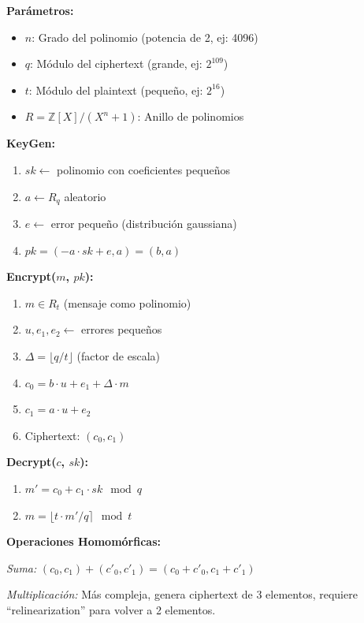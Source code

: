 \documentclass[11pt,a4paper,twoside]{book}
\theoremstyle{definition}
\theoremstyle{remark}
\begin{document}
\begin{mathnote}
\textbf{Parámetros:}
\begin{itemize}
    \item $n$: Grado del polinomio (potencia de 2, ej: 4096)
    \item $q$: Módulo del ciphertext (grande, ej: $2^{109}$)
    \item $t$: Módulo del plaintext (pequeño, ej: $2^{16}$)
    \item $R = \mathbb{Z}[X]/(X^n + 1)$: Anillo de polinomios
\end{itemize}

\textbf{KeyGen:}
\begin{enumerate}
    \item $sk \leftarrow$ polinomio con coeficientes pequeños
    \item $a \leftarrow R_q$ aleatorio
    \item $e \leftarrow$ error pequeño (distribución gaussiana)
    \item $pk = (-a \cdot sk + e, a) = (b, a)$
\end{enumerate}

\textbf{Encrypt($m$, $pk$):}
\begin{enumerate}
    \item $m \in R_t$ (mensaje como polinomio)
    \item $u, e_1, e_2 \leftarrow$ errores pequeños
    \item $\Delta = \lfloor q/t \rfloor$ (factor de escala)
    \item $c_0 = b \cdot u + e_1 + \Delta \cdot m$
    \item $c_1 = a \cdot u + e_2$
    \item Ciphertext: $(c_0, c_1)$
\end{enumerate}

\textbf{Decrypt($c$, $sk$):}
\begin{enumerate}
    \item $m' = c_0 + c_1 \cdot sk \mod q$
    \item $m = \lfloor t \cdot m' / q \rceil \mod t$
\end{enumerate}

\textbf{Operaciones Homomórficas:}

\textit{Suma:} $(c_0, c_1) + (c'_0, c'_1) = (c_0 + c'_0, c_1 + c'_1)$

\textit{Multiplicación:} Más compleja, genera ciphertext de 3 elementos, requiere ``relinearization'' para volver a 2 elementos.
\end{mathnote}
\end{document}
